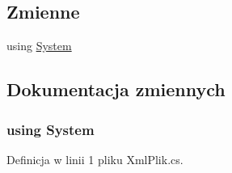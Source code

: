 \subsection*{Zmienne}
\begin{CompactItemize}
\item 
﻿using \hyperlink{a00054_81a223a02c34d82b47199f08308847f2}{System}
\end{CompactItemize}


\subsection{Dokumentacja zmiennych}
\hypertarget{a00054_81a223a02c34d82b47199f08308847f2}{
\subsubsection[{System}]{\setlength{\rightskip}{0pt plus 5cm}﻿using {\bf System}}}
\label{d1/dea/a00054_81a223a02c34d82b47199f08308847f2}




Definicja w linii 1 pliku XmlPlik.cs.